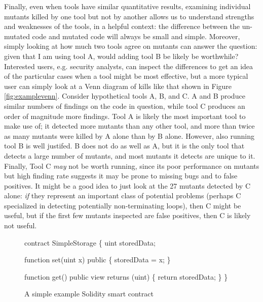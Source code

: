 Finally, even when tools have similar quantitative results, examining individual mutants killed by one tool but not by another allows us to understand strengths and weaknesses of the tools, in a helpful context: the difference between the un-mutated code and mutated code will always be small and simple.  Moreover, simply looking at how much two tools agree on mutants can answer the question: given that I am using tool A, would adding tool B be likely be worthwhile?  Interested users, e.g. security analysts, can inspect the differences to get an idea of the particular cases when a tool might be most effective, but a more typical user can simply look at a Venn diagram of kills like that shown in Figure \ref{fig:examplevenn}.  Consider hypothetical tools A, B, and C.  A and B produce similar numbers of findings on the code in question, while tool C produces an order of magnitude more findings.  Tool A is likely the most important tool to make use of; it detected more mutants than any other tool, and more than twice as many mutants were killed by A alone than by B alone.  However, also running tool B is well justifed.  B does not do as well as A, but it is the only tool that detects a large number of mutants, and most mutants it detects are unique to it.  Finally, Tool C \emph{may} not be worth running, since its poor performance on mutants but high finding rate suggests it may be prone to missing bugs and to false positives.  It might be a good idea to just look at the 27 mutants detected by C alone:  \emph{if} they represent an important class of potential problems (perhaps C specialized in detecting potentially non-terminating loops), then C might be useful, but if the first few mutants inspected are false positives, then C is likely not useful.

\begin{figure}
{\scriptsize
\begin{code}
contract SimpleStorage \{
    uint storedData;

    function set(uint x) public \{
        storedData = x;
    \}

    function get() public view returns (uint) \{
        return storedData;
    \}
  \}
\end{code}
}
\caption{A simple example Solidity smart contract}
\label{fig:sol424intro}
\end{figure}

